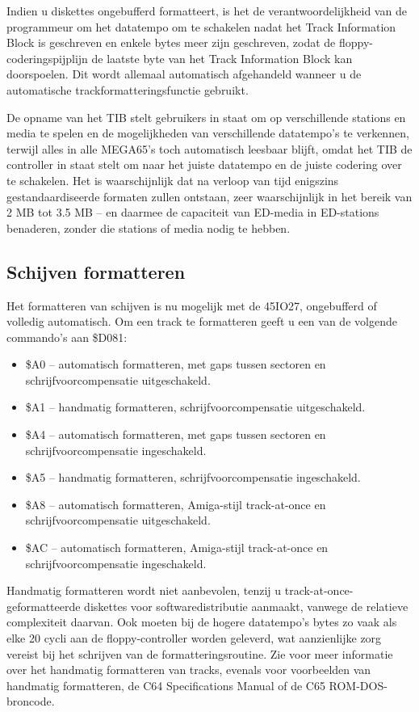 Indien u diskettes ongebufferd formatteert, is het de verantwoordelijkheid van de programmeur om het datatempo om te schakelen nadat het Track Information Block is geschreven en enkele bytes meer zijn geschreven, zodat de floppy-coderingspijplijn de laatste byte van het Track Information Block kan doorspoelen. Dit wordt allemaal automatisch afgehandeld wanneer u de automatische trackformatteringsfunctie gebruikt.

De opname van het TIB stelt gebruikers in staat om op verschillende stations en media te spelen en de mogelijkheden van verschillende datatempo's te verkennen, terwijl alles in alle MEGA65's toch automatisch leesbaar blijft, omdat het TIB de controller in staat stelt om naar het juiste datatempo en de juiste codering over te schakelen. Het is waarschijnlijk dat na verloop van tijd enigszins gestandaardiseerde formaten zullen ontstaan, zeer waarschijnlijk in het bereik van 2 MB tot 3.5 MB -- en daarmee de capaciteit van ED-media in ED-stations benaderen, zonder die stations of media nodig te hebben.

\subsection{Schijven formatteren}

Het formatteren van schijven is nu mogelijk met de 45IO27, ongebufferd of volledig automatisch. Om een track te formatteren geeft u een van de volgende commando's aan \$D081:

\begin{itemize}
\item \$A0 -- automatisch formatteren, met gaps tussen sectoren en schrijfvoorcompensatie uitgeschakeld.\item \$A1 -- handmatig formatteren, schrijfvoorcompensatie uitgeschakeld.\item \$A4 -- automatisch formatteren, met gaps tussen sectoren en schrijfvoorcompensatie ingeschakeld.\item \$A5 -- handmatig formatteren, schrijfvoorcompensatie ingeschakeld.\item \$A8 -- automatisch formatteren, Amiga-stijl track-at-once en schrijfvoorcompensatie uitgeschakeld.\item \$AC -- automatisch formatteren, Amiga-stijl track-at-once en schrijfvoorcompensatie ingeschakeld.
\end{itemize}

Handmatig formatteren wordt niet aanbevolen, tenzij u track-at-once-geformatteerde diskettes voor softwaredistributie aanmaakt, vanwege de relatieve complexiteit daarvan. Ook moeten bij de hogere datatempo's bytes zo vaak als elke 20 cycli aan de floppy-controller worden geleverd, wat aanzienlijke zorg vereist bij het schrijven van de formatteringsroutine. Zie voor meer informatie over het handmatig formatteren van tracks, evenals voor voorbeelden van handmatig formatteren, de C64 Specifications Manual of de C65 ROM-DOS-broncode.

